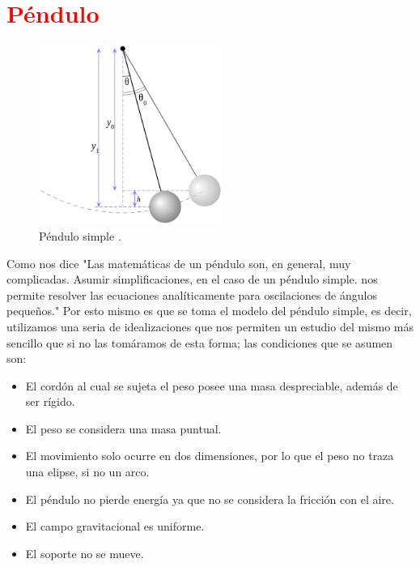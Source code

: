 \documentclass[12pt]{article}
\begin{document}
\section*{\textcolor{Red}{Péndulo}}
\begin{figure}
	\begin{center}
      \includegraphics[width=6.0cm]{pendulo.png}
      \caption{Péndulo simple \cite{Img1}.}
    \end{center}
\end{figure}
Como nos dice \cite{Wik} "Las matemáticas de un péndulo son, en general, muy complicadas. Asumir simplificaciones, en el caso de un péndulo simple. nos permite resolver las ecuaciones analíticamente para oscilaciones de ángulos pequeños."
Por esto mismo es que se toma el modelo del péndulo simple, es decir, utilizamos una seria de idealizaciones que nos permiten un estudio del mismo más sencillo que si no las tomáramos de esta forma; las condiciones que se asumen son:\\

\begin{itemize}
\item El cordón al cual se sujeta el peso posee una masa despreciable, además de ser rígido.
\item El peso se considera una masa puntual.
\end{itemize}
\pagebreak

\begin{itemize}
\item El movimiento solo ocurre en dos dimensiones, por lo que el peso no traza una elipse, si no un arco.
\item El péndulo no pierde energía ya que no se considera la fricción con el aire.
\item El campo gravitacional es uniforme.
\item El soporte no se mueve.
\end{itemize}
\end{document}

